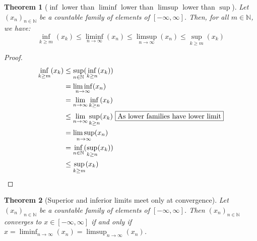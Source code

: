 \documentclass{article}
\newtheorem{theorem}{Theorem}[section]
\theoremstyle{definition}
\theoremstyle{remark}
\theoremstyle{example}
\theoremstyle{notation}
\theoremstyle{axiom}
\begin{document}
\begin{theorem}[$\inf$ lower than $\liminf$ lower than $\limsup$ lower than $\sup$] \label{inf-leq-liminf-leq-limsup-leq-sup}
		Let $(x_n)_{n \in \mathbb{N}}$ be a countable family of elements of $[-\infty, \infty]$. Then, for all $m \in \mathbb{N}$, we have:
				$$\inf_{k \geq m}(x_k) \leq \liminf_{n \rightarrow \infty}(x_n) \leq \limsup_{n \rightarrow \infty}(x_n) \leq \sup_{k \geq m}(x_k)$$
\end{theorem}

\begin{proof}
		\begin{align*}
				\inf_{k \geq m}(x_k) &\leq \sup_{n \in \mathbb{N}}(\inf_{k \geq n}(x_k))\\
									 &= \liminf_{n \rightarrow \infty}(x_n)\\
									 &= \lim_{n \rightarrow \infty} \inf_{k \geq n}(x_k)\\
									 &\leq \lim_{n \rightarrow \infty} \sup_{k \geq n}(x_k) \text{ \fbox{As lower families have lower limit}}\\
									 &= \limsup_{n \rightarrow \infty}(x_n)\\
									 &= \inf_{n \in \mathbb{N}}(\sup_{k \geq n}(x_k))\\
									 &\leq \sup_{k \geq m}(x_k)
		\end{align*}
\end{proof}

\begin{theorem}[Superior and inferior limits meet only at convergence] \label{limsup-eq-liminf-iff-converge}%
		Let $(x_n)_{n \in \mathbb{N}}$ be a countable family of elements of $[-\infty, \infty]$. Then $(x_n)_{n \in \mathbb{N}}$ converges to $x \in [-\infty, \infty]$ if and only if $x = \liminf_{n \rightarrow \infty}(x_n) = \limsup_{n \rightarrow \infty}(x_n)$.
\end{theorem}
\end{document}
